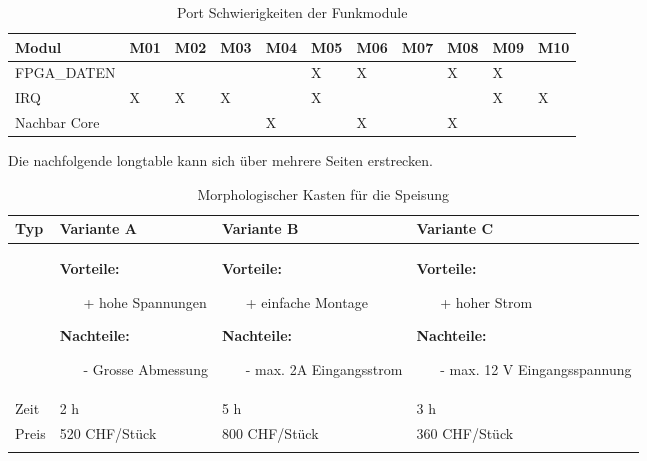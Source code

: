 \begin{table}[ht] \centering
	\begin{tabular}{|p{3cm}|p{.5cm}|p{.5cm}|p{.5cm}|p{.5cm}|p{.5cm}|p{.5cm}|p{.5cm}|p{.5cm}|p{.5cm}|p{.5cm}|} \hline
		\rowcolor{gray} Modul & M01 & M02 & M03 & M04 & M05 & M06 & M07 & M08 & M09 & M10 \\
		\hline
		FPGA\_DATEN & & & & & X & X & & X & X & \\
		\hline
		IRQ & X & X & X & & X & & & & X & X \\
		\hline
		Nachbar Core & & & & X & & X & & X & & \\
		\hline
	\end{tabular}
	\caption{Port Schwierigkeiten der Funkmodule}
	\label{tab:portprobleme}
 \end{table}	

Die nachfolgende longtable kann sich über mehrere Seiten erstrecken.

\begin{longtable}{|p{1.1cm}|p{4cm}|p{4cm}|p{4cm}|} 
					\hline
					\rowcolor{gray} Typ & Variante A & Variante B & Variante C
					\\ \hline
					& \textbf{Vorteile:} 
							\begin{itemize}
								\item[+] hohe Spannungen
							\end{itemize}							
							\textbf{Nachteile:}
							\begin{itemize}
								\item[-] Grosse Abmessung
							\end{itemize}
					& 	\textbf{Vorteile:} 
							\begin{itemize}
								\item[+] einfache Montage
							\end{itemize}							
							\textbf{Nachteile:}
							\begin{itemize}
								\item[-] max. 2A Eingangsstrom
							\end{itemize}
					&	\textbf{Vorteile:} 
							\begin{itemize}
								\item[+] hoher Strom
							\end{itemize}							
							\textbf{Nachteile:}
							\begin{itemize}
								\item[-] max. 12 V Eingangsspannung
							\end{itemize}\\ \hline
						Zeit & 2 h & 5 h & 3 h \\ \hline
						Preis	& 520 CHF/Stück & 800 CHF/Stück &	360 CHF/Stück\\ \hline
				\caption{Morphologischer Kasten für die Speisung}
				\label{tab:morphkasten}
			\end{longtable}	

